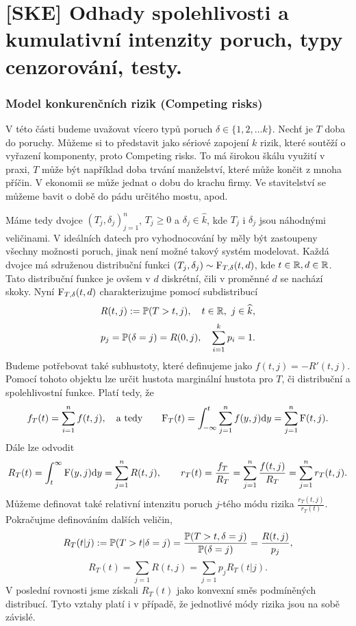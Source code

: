 \chapter{[SKE] Odhady spolehlivosti a kumulativní intenzity poruch, typy cenzorování, testy.}

    \subsection*{Model konkurenčních rizik (Competing risks)}
    
    V této části budeme uvažovat vícero typů poruch $\delta \in \lbrace1,2,\dots k \rbrace$. Nechť je $T$ doba do poruchy. Můžeme si to představit jako sériové zapojení $k$ rizik, které soutěží o vyřazení komponenty, proto Competing risks. To má širokou škálu využití v praxi, $T$ může být například doba trvání manželství, které může končit z mnoha příčin. V ekonomii se může jednat o dobu do krachu firmy. Ve stavitelství se můžeme bavit o době do pádu určitého mostu, apod.
    
    Máme tedy dvojce $(T_j, \delta_j)_{j=1}^n$, $T_j \geq 0$ a $\delta_j\in\widehat{k}$, kde $T_j$ i $\delta_j$ jsou náhodnými veličinami. V ideálních datech pro vyhodnocování by měly být zastoupeny všechny možnosti poruch, jinak není možné takový systém modelovat. Každá dvojce má sdruženou distribuční funkci $(T_j, \delta_j) \sim \mathrm{F}_{T,\delta}(t,d)$, kde $t\in\mathbb{R}, d\in \mathbb{R}$. Tato distribuční funkce je ovšem v $d$ diskrétní, čili v proměnné $d$ se nachází skoky. Nyní $\mathrm{F}_{T,\delta}(t,d)$ charakterizujme pomocí subdistribucí
    $$R(t,j) := \mathbb{P}(T > t, j),\quad t \in \mathbb{R},~j \in \widehat{k},$$ 
    $$p_j = \mathbb{P}(\delta = j) = R(0,j),\quad\sum_{i=1}^k p_i = 1.$$ 
    Budeme potřebovat také subhustoty, které definujeme jako $f(t,j)=-R'(t,j)$. Pomocí tohoto objektu lze určit hustota marginální hustota pro $T$, či distribuční a spolehlivostní funkce. Platí tedy, že
    $$f_T(t) = \sum_{i = 1}^{n}f(t,j),\quad\text{a tedy}\qquad\mathrm{F}_T(t) = \int_{-\infty}^{t} \sum_{j=1}^n f(y,j)\mathrm{d} y = \sum_{j=1}^n \mathrm{F}(t,j).  $$
    Dále lze odvodit
    $$R_T(t) = \int_{t}^{\infty} \mathrm{F}(y,j) \mathrm{d} y = \sum_{j=1}^n R(t,j),\qquad r_T(t) = \frac{f_T}{R_T} = \sum_{j=1}^n\frac{f(t,j)}{R_T} = \sum_{j=1}^n r_T(t,j). $$
    Můžeme definovat také relativní intenzitu poruch $j$-tého módu rizika $\frac{r_T(t,j)}{r_T(t)}$.
    Pokračujme definováním dalších veličin,
    $$ R_T(t|j) := \mathbb{P}(T > t|\delta =j) = \frac{\mathbb{P}(T > t, \delta =j)}{\mathbb{P}(\delta =j)} = \frac{R(t,j)}{p_j}, $$
    $$R_T(t) = \sum_{j=1}R(t,j) = \sum_{j=1}p_j R_T(t|j).$$
    V poslední rovnosti jsme získali $R_T(t)$ jako konvexní směs podmíněných distribucí. Tyto vztahy platí i v případě, že jednotlivé módy rizika jsou na sobě závislé.


